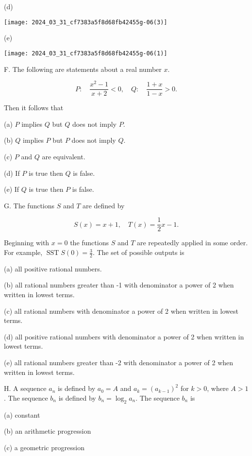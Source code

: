 \documentclass[10pt]{article}
\begin{document}
(d)

\begin{center}
\texttt{[image: 2024\_03\_31\_cf7383a5f8d68fb42455g-06(3)]}
\end{center}

(e)

\begin{center}
\texttt{[image: 2024\_03\_31\_cf7383a5f8d68fb42455g-06(1)]}
\end{center}

F. The following are statements about a real number $x$.

$$
P: \quad \frac{x^{2}-1}{x+2}<0, \quad Q: \quad \frac{1+x}{1-x}>0 .
$$

Then it follows that

(a) $P$ implies $Q$ but $Q$ does not imply $P$.

(b) $Q$ implies $P$ but $P$ does not imply $Q$.

(c) $P$ and $Q$ are equivalent.

(d) If $P$ is true then $Q$ is false.

(e) If $Q$ is true then $P$ is false.

G. The functions $S$ and $T$ are defined by

$$
S(x)=x+1, \quad T(x)=\frac{1}{2} x-1 .
$$

Beginning with $x=0$ the functions $S$ and $T$ are repeatedly applied in some order. For example, $\operatorname{SST} S(0)=\frac{3}{2}$. The set of possible outputs is

(a) all positive rational numbers.

(b) all rational numbers greater than -1 with denominator a power of 2 when written in lowest terms.

(c) all rational numbers with denominator a power of 2 when written in lowest terms.

(d) all positive rational numbers with denominator a power of 2 when written in lowest terms.

(e) all rational numbers greater than -2 with denominator a power of 2 when written in lowest terms.

H. A sequence $a_{n}$ is defined by $a_{0}=A$ and $a_{k}=\left(a_{k-1}\right)^{2}$ for $k>0$, where $A>1$. The sequence $b_{n}$ is defined by $b_{n}=\log _{2} a_{n}$. The sequence $b_{n}$ is

(a) constant

(b) an arithmetic progression

(c) a geometric progression
\end{document}

